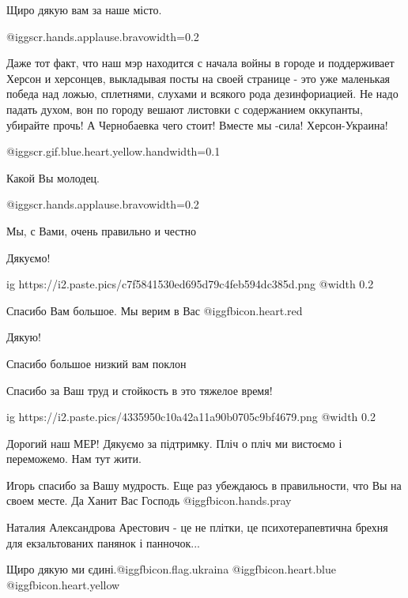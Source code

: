 \begin{itemize}
Щиро дякую вам за наше місто.


@igg{scr.hands.applause.bravo}{width=0.2}


Даже тот факт, что наш мэр находится с начала войны в городе и поддерживает
Херсон и херсонцев, выкладывая посты на своей странице - это уже маленькая победа
над ложью, сплетнями, слухами и всякого рода дезинфориацией. Не надо падать
духом, вон по городу вешают листовки с содержанием оккупанты, убирайте прочь! А
Чернобаевка чего стоит! Вместе мы -сила! Херсон-Украина!


@igg{scr.gif.blue.heart.yellow.hand}{width=0.1}

Какой Вы молодец.


@igg{scr.hands.applause.bravo}{width=0.2}

Мы, с Вами, очень правильно и честно

Дякуємо!

\ifcmt
  ig https://i2.paste.pics/c7f5841530ed695d79c4feb594dc385d.png
  @width 0.2
\fi

Спасибо Вам большое. Мы верим в Вас @igg{fbicon.heart.red}

Дякую!

Спасибо большое низкий вам поклон

Спасибо за Ваш труд и стойкость в это тяжелое время!

\ifcmt
  ig https://i2.paste.pics/4335950c10a42a11a90b0705c9bf4679.png
  @width 0.2
\fi

Дорогий наш МЕР! Дякуємо за підтримку. Пліч о пліч ми вистоємо і переможемо. Нам тут жити.

Игорь спасибо за Вашу мудрость. Еще раз убеждаюсь в правильности, что Вы на своем месте.
Да Ханит Вас Господь @igg{fbicon.hands.pray} 

Наталия Александрова Арестович - це не плітки, це психотерапевтична брехня для екзальтованих панянок і панночок...

Щиро дякую ми єдині.@igg{fbicon.flag.ukraina} @igg{fbicon.heart.blue}  @igg{fbicon.heart.yellow} 


\end{itemize}
